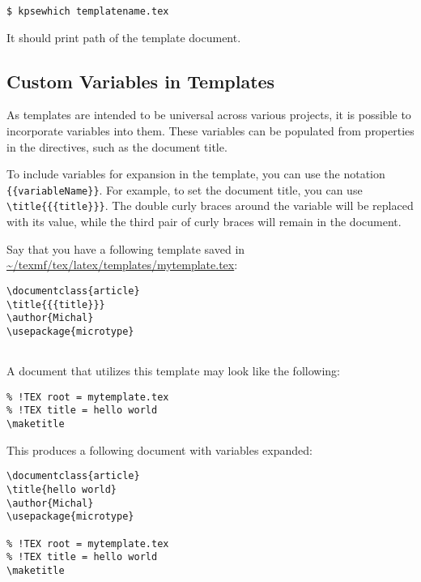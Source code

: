 \begin{verbatim}
$ kpsewhich templatename.tex
\end{verbatim}

It should print path of the template document.

\subsection{Custom Variables in Templates}\label{sec:variables}

As templates are intended to be universal across various projects, it is
possible to incorporate variables into them. These variables can be populated
from properties in the directives, such as the document title.

To include variables for expansion in the template, you can use the notation
\verb|{{variableName}}|. For example, to set the document title, you can use
\texttt{\textbackslash title\{\{\{title\}\}\}}. The double curly braces around
the variable will be replaced with its value, while the third pair of curly braces will remain in the
document.

Say that you have a following template saved in \url{~/texmf/tex/latex/templates/mytemplate.tex}:

\begin{verbatim}
\documentclass{article}
\title{{{title}}}
\author{Michal}
\usepackage{microtype}


\end{verbatim}


A document that utilizes this template may look like the following:

\begin{verbatim}
% !TEX root = mytemplate.tex
% !TEX title = hello world
\maketitle
\end{verbatim}


This produces a following document with variables expanded:

\begin{verbatim}
\documentclass{article}
\title{hello world}
\author{Michal}
\usepackage{microtype}

% !TEX root = mytemplate.tex
% !TEX title = hello world
\maketitle

\end{verbatim}

